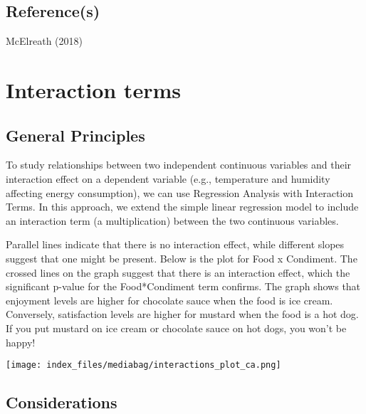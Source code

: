 \documentclass[
  letterpaper,
  DIV=11,
  numbers=noendperiod]{scrreprt}
\begin{document}
\section{Reference(s)}\label{references-1}

McElreath (2018)


\chapter{Interaction terms}\label{interaction-terms}

\section{General Principles}\label{general-principles-2}

To study relationships between two independent continuous variables and
their interaction effect on a dependent variable (e.g., temperature and
humidity affecting energy consumption), we can use Regression Analysis
with Interaction Terms. In this approach, we extend the simple linear
regression model to include an interaction term (a multiplication)
between the two continuous variables.

Parallel lines indicate that there is no interaction effect, while
different slopes suggest that one might be present. Below is the plot
for Food x Condiment. The crossed lines on the graph suggest that there
is an interaction effect, which the significant p-value for the
Food*Condiment term confirms. The graph shows that enjoyment levels are
higher for chocolate sauce when the food is ice cream. Conversely,
satisfaction levels are higher for mustard when the food is a hot dog.
If you put mustard on ice cream or chocolate sauce on hot dogs, you
won't be happy!

\texttt{[image: index\_files/mediabag/interactions\_plot\_ca.png]}

\section{Considerations}\label{considerations-2}
\end{document}
